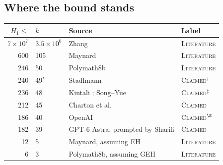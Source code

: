 \documentclass[11pt]{amsart}
\theoremstyle{definition}
\theoremstyle{remark}
\newcommand{\lbl}[1]{\textup{\textsc{#1}}}
\begin{document}
\subsection*{Where the bound stands}

\begin{center}
\begin{tabular}{@{}rlll@{}}
\toprule
$H_1\le$ & $k$ & Source & Label\\
\midrule
$7\times10^7$ & $3.5\times10^6$ & Zhang \cite{Zha14} & \lbl{Literature}\\
600 & 105 & Maynard \cite{May15} & \lbl{Literature}\\
246 & 50 & Polymath8b \cite{Pol14b} & \lbl{Literature}\\
240 & 49$^{\ast}$ & Stadlmann \cite{Sta26} & \lbl{Claimed}$^{\dagger}$\\
236 & 48 & Kintali \cite{Kin26}; Song--Yue \cite{SY26} & \lbl{Claimed}$^{\ddagger}$\\
212 & 45 & Charton et al.\ \cite{Cha26} & \lbl{Claimed}\\
186 & 40 & OpenAI \cite{OAI26} & \lbl{Claimed}$^{\S}$\\
182 & 39 & GPT-6 Astra, prompted by Sharifi \cite{Sha26} & \lbl{Claimed}\\
\midrule
12 & 5 & Maynard, assuming EH \cite{May15} & \lbl{Literature}\\
6 & 3 & Polymath8b, assuming GEH \cite{Pol14b} & \lbl{Literature}\\
\bottomrule
\end{tabular}
\end{center}
\end{document}
